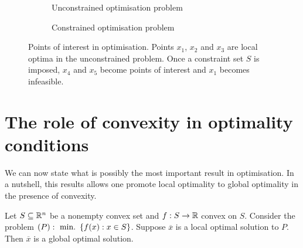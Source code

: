 \begin{figure}
	\begin{subfigure}{\textwidth}
	\centering
		\caption{Unconstrained optimisation problem}\label{fig:unconstrained}	
	\end{subfigure}
	\begin{subfigure}{\textwidth}
	\centering
		\caption{Constrained optimisation problem}\label{fig:constrained}		
	\end{subfigure}
	\caption{Points of interest in optimisation. Points $x_1$, $x_2$ and $x_3$ are local optima in the unconstrained problem. Once a constraint set $S$ is imposed, $x_4$ and $x_5$ become points of interest and $x_1$ becomes infeasible.} \label{fig:example_optima}		
\end{figure}


\section{The role of convexity in optimality conditions}


We can now state what is possibly the most important result in optimisation. In a nutshell, this results allows one promote local optimality to global optimality in the presence of convexity. 

\begin{theorem}\label{thm:convex_global}
Let $S \subseteq \mathbb{R}^n$ be a nonempty convex set and $f:S \to \mathbb{R}$ convex on $S$. Consider the problem $(P):~\mathop{\text{min.~}} \left\{ f(x) : x \in S \right \}$. Suppose $\overline{x}$ is a local optimal solution to $P$. Then $\overline{x}$ is a global optimal solution.
\end{theorem}

